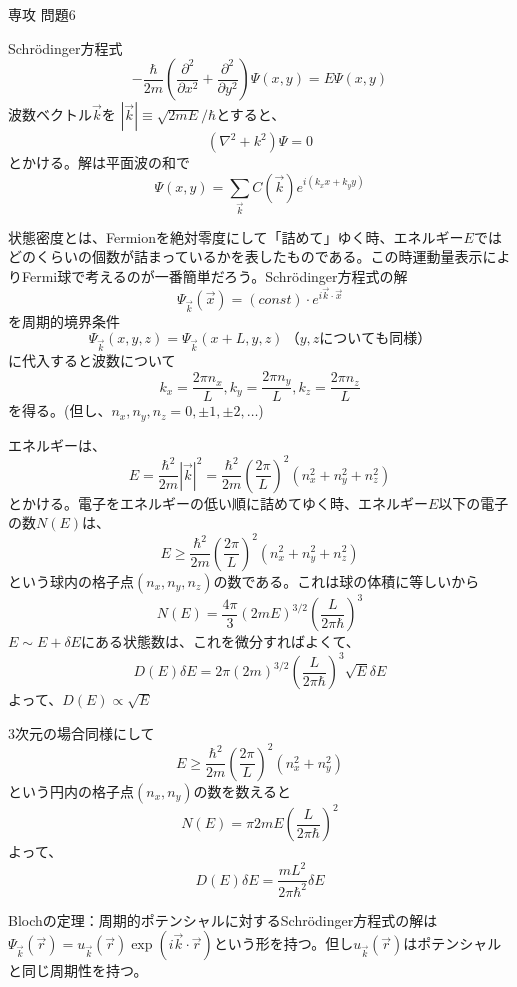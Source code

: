 \documentclass[fleqn]{jbook}
\begin{document}
\begin{answer}{専攻 問題6}

\begin{subanswers}
\SubAnswer
Schr\"{o}dinger方程式
	\[ -\frac{\hbar}{2m}\left( \frac{\partial ^2}{\partial x^2}+\frac{\partial ^2}{\partial y^2}\right)\Psi (x,y)=E\Psi(x,y) \]
	波数ベクトル$\Vec{k}を$ $|\Vec{k}|\equiv \sqrt{2mE}/\hbar$とすると、
	\[ (\nabla ^2 + k^2)\Psi =0 \]
	とかける。解は平面波の和で
	\[ \Psi (x,y)=\sum_{\Vec{k}} C(\Vec{k})e^{i(k_x x+k_y y)} \]
	
\SubAnswer
状態密度とは、Fermionを絶対零度にして「詰めて」ゆく時、エネルギー$E$ではどのくらいの個数が詰まっているかを表したものである。この時運動量表示によりFermi球で考えるのが一番簡単だろう。Schr\"{o}dinger方程式の解
	\[ \Psi_{\Vec{k}}(\Vec{x})=(const)\cdot e^{i\Vec{k}\cdot \Vec{x}} \]
	を周期的境界条件
	\[ \Psi_{\Vec{k}}(x,y,z)=\Psi_{\Vec{k}}(x+L,y,z)　\,　　（y,zについても同様）\]
に代入すると波数について
\[k_x=\frac{2\pi n_x}{L},k_y=\frac{2\pi n_y}{L},k_z=\frac{2\pi n_z}{L}\]
を得る。(但し、$n_x,n_y,n_z=0,\pm 1,\pm 2, \ldots$)

エネルギーは、
\[E=\frac{\hbar^2}{2m}|\Vec{k}|^2=\frac{\hbar^2}{2m}\left( \frac{2\pi}{L}\right)^2(n_x^2+n_y^2+n_z^2)\]
とかける。電子をエネルギーの低い順に詰めてゆく時、エネルギー$E$以下の電子の数$N(E)$は、
\[E \ge \frac{\hbar^2}{2m}\left( \frac{2\pi}{L}\right)^2(n_x^2+n_y^2+n_z^2)\]
という球内の格子点$(n_x,n_y,n_z)$の数である。これは球の体積に等しいから
\[N(E)=\frac{4\pi}{3}(2mE)^{3/2}\left( \frac{L}{2\pi \hbar}\right)^3\]
$E\sim E+\delta E$にある状態数は、これを微分すればよくて、
\[D(E)\delta E=2\pi (2m)^{3/2}\left( \frac{L}{2\pi \hbar}\right)^3\sqrt{E}\delta E\]
よって、$D(E)\propto \sqrt{E}$


\SubAnswer
3次元の場合同様にして
\[E \ge \frac{\hbar^2}{2m}\left( \frac{2\pi}{L}\right)^2(n_x^2+n_y^2)\]
という円内の格子点$(n_x,n_y)$の数を数えると
\[N(E)=\pi 2m E\left( \frac{L}{2\pi \hbar}\right)^2\]
よって、
\[D(E)\delta E = \frac{mL^2}{2\pi \hbar^2}\delta E\]

\SubAnswer
Blochの定理：周期的ポテンシャルに対するSchr\"{o}dinger方程式の解は$\Psi_{\Vec{k}}(\Vec{r})=u_{\Vec{k}}(\Vec{r}) \exp (i\Vec{k}\cdot \Vec{r})$という形を持つ。但し$u_{\Vec{k}}(\Vec{r})$はポテンシャルと同じ周期性を持つ。


\end{subanswers}
\end{answer}
\end{document}
